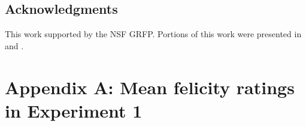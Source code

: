 \documentclass[man, noapacite]{apa2}
\begin{document}
\subsection{Acknowledgments}
This work supported by the NSF GRFP. Portions of this work were presented in  and .



\setlength{\bibleftmargin}{.125in}
\setlength{\bibindent}{-\bibleftmargin}



\newpage
\theappendix

\section{Appendix A: Mean felicity ratings in Experiment 1}\label{appendix:exp1}
\end{document}
